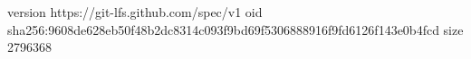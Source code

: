 version https://git-lfs.github.com/spec/v1
oid sha256:9608de628eb50f48b2dc8314c093f9bd69f5306888916f9fd6126f143e0b4fcd
size 2796368
